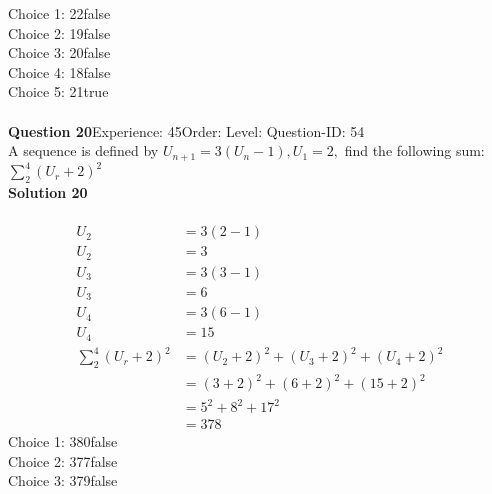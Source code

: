 \documentclass{article}
\begin{document}
Choice 1: \hspace{20pt}22\hspace{20pt}false\\
Choice 2: \hspace{20pt}19\hspace{20pt}false\\
Choice 3: \hspace{20pt}20\hspace{20pt}false\\
Choice 4: \hspace{20pt}18\hspace{20pt}false\\
Choice 5: \hspace{20pt}21\hspace{20pt}true\\
\\[4pt]
\noindent\textbf{Question 20}\hspace{20pt}Experience: 45\hspace{20pt}Order: \hspace{20pt}Level: \hspace{20pt}Question-ID: 54\\[2pt]
A sequence is defined by $U_{n+1}=3(U_n -1), U_1=2,$ find the following sum: $\displaystyle\sum_{2}^{4} (U_r+2)^2$\\[4pt]
\noindent\textbf{Solution 20}\\[2pt]
\\[-35pt]\begin{align*}
U_2&=3(2-1)\\[2pt]
U_2&=3\\[12pt]
U_3&=3(3-1)\\[2pt]
U_3&=6\\[12pt]
U_4&=3(6-1)\\[2pt]
U_4&=15\\[12pt]
\displaystyle\sum_{2}^{4} (U_r+2)^2&=(U_2+2)^2+(U_3+2)^2+(U_4+2)^2\\[2pt]
&=(3+2)^2+(6+2)^2+(15+2)^2\\[2pt]
&=5^2+8^2+17^2\\[2pt]
&=378
\end{align*}
Choice 1: \hspace{20pt}380\hspace{20pt}false\\
Choice 2: \hspace{20pt}377\hspace{20pt}false\\
Choice 3: \hspace{20pt}379\hspace{20pt}false\\
\end{document}
